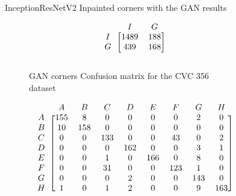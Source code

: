 \begin{figure}[h]
\caption{InceptionResNetV2 Inpainted corners with  the GAN results}
\myfontsize
\caption*{\footnotesize \textmd{ \textbf{A}:{dyed-lifted-polyps} , \textbf{B}:{dyed-resection-margins} , \textbf{C}:{esophagitis} , \textbf{D}:{normal-cecum} , \textbf{E}:{normal-pylorus} , \textbf{F}:{normal-z-line} , \textbf{G}:{polyps} , \textbf{H}:{ulcerative-colitis} , \textbf{I}:{non-polyp}}}

\begin{subfigure}[b]{0.25\textwidth}
     
\[
\begin{blockarray}{ccc}
& I & G  \\
\begin{block}{c[cc]}
        I&1489 &  188\\
        G& 439 &  168\\
\end{block}
\end{blockarray}
 \]         

\caption{GAN corners Confusion matrix for the CVC 356 dataset}
\label{mat:cvc356_CM_IRV2_GAN_CORNER}
\end{subfigure}
\begin{subfigure}[b]{0.49\textwidth}  
\scriptsize     
\[
\begin{blockarray}{ccccccccc}
& A & B & C & D & E & F & G & H \\
\begin{block}{c[cccccccc]}
A&155 & 8 & 0 & 0 & 0 & 0 & 2 & 0\\
B& 10 & 158 & 0 & 0 & 0 & 0 & 0 & 0\\
C&  0 & 0 & 133 & 0 & 0 & 43 & 0 & 2\\
D&  0 & 0 & 0 & 162 & 0 & 0 & 3 & 1\\
E&  0 & 0 & 1 & 0 & 166 & 0 & 8 & 0\\
F&  0 & 0 & 31 & 0 & 0 & 123 & 1 & 0\\
G&  0 & 0 & 0 & 2 & 0 & 0 & 143 & 0\\
H&  1 & 0 & 1 & 2 & 0 & 0 & 9 & 163\\
\end{block}
\end{blockarray}
 \]        
        

\end{subfigure}
\end{figure}
